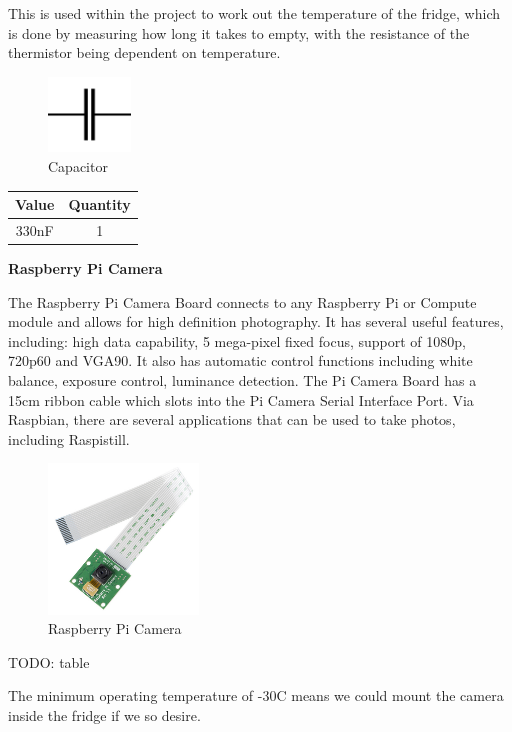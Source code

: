 \documentclass[10pt]{article}
\begin{document}
This is used within the project to work out the temperature of the fridge, which is done by measuring how long it takes to empty, with the resistance of the thermistor being dependent on temperature.

\begin{figure}[h]
\centering
\caption{Capacitor}
\label{Capacitor}
\includegraphics[height=2cm]{images/capacitor_diagram.jpg}
\end{figure}

\begin{center}
	\begin{tabular}{|c|c|}
		\hline
		Value & Quantity \\ \hline
		330nF & 1 \\ \hline
	\end{tabular}
\end{center}

\textbf{Raspberry Pi Camera}

The Raspberry Pi Camera Board connects to any Raspberry Pi or Compute module and allows for high definition photography. It has several useful features, including: high data capability, 5 mega-pixel fixed focus, support of 1080p, 720p60 and VGA90. It also has automatic control functions including white balance, exposure control, luminance detection.
The Pi Camera Board has a 15cm ribbon cable which slots into the Pi Camera Serial Interface Port. Via Raspbian, there are several applications that can be used to take photos, including Raspistill.

\begin{figure}[h]
\centering
\caption{Raspberry Pi Camera}
\label{Raspberry Pi Camera}
\includegraphics[height=4cm]{images/pi-camera.jpg}
\end{figure}

TODO: table

The minimum operating temperature of -30\degree C means we could mount the camera inside the fridge if we so desire.
\end{document}
